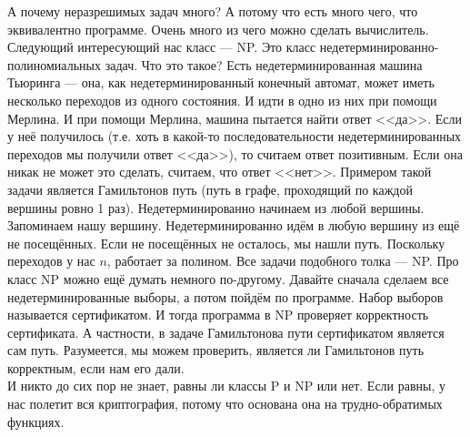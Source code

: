 \documentclass{article}
\begin{document}
    А почему неразрешимых задач много? А потому что есть много чего, что эквивалентно программе. Очень много из чего можно сделать вычислитель.\\
    Следующий интересующий нас класс --- NP. Это класс недетерминированно-полиномиальных задач. Что это такое? Есть недетерминированная машина Тьюринга --- она, как недетерминированный конечный автомат, может иметь несколько переходов из одного состояния. И идти в одно из них при помощи Мерлина. И при помощи Мерлина, машина пытается найти ответ <<да>>. Если у неё получилось (т.е. хоть в какой-то последовательности недетерминированных переходов мы получили ответ <<да>>), то считаем ответ позитивным. Если она никак не может это сделать, считаем, что ответ <<нет>>. Примером такой задачи является Гамильтонов путь (путь в графе, проходящий по каждой вершины ровно 1 раз). Недетерминированно начинаем из любой вершины. Запоминаем нашу вершину. Недетерминированно идём в любую вершину из ещё не посещённых. Если не посещённых не осталось, мы нашли путь. Поскольку переходов у нас $n$, работает за полином. Все задачи подобного толка --- NP. Про класс NP можно ещё думать немного по-другому. Давайте сначала сделаем все недетерминированные выборы, а потом пойдём по программе. Набор выборов называется сертификатом. И тогда программа в NP проверяет корректность сертификата. А частности, в задаче Гамильтонова пути сертификатом является сам путь. Разумеется, мы можем проверить, является ли Гамильтонов путь корректным, если нам его дали.\\
    И никто до сих пор не знает, равны ли классы P и NP или нет. Если равны, у нас полетит вся криптография, потому что основана она на трудно-обратимых функциях.\\
\end{document}
